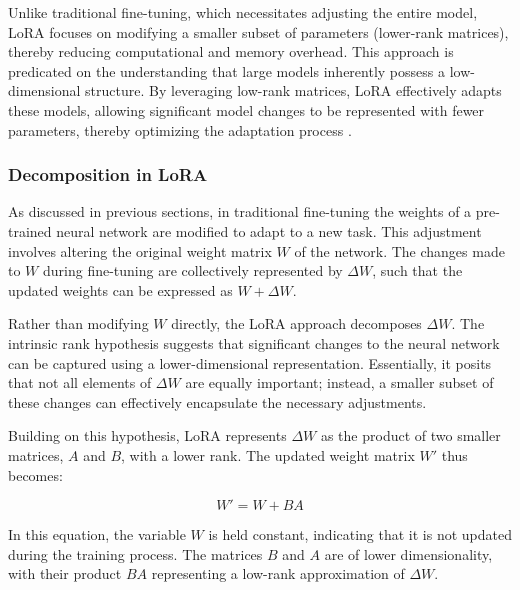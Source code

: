 Unlike traditional fine-tuning, which necessitates adjusting the entire model, LoRA focuses on modifying a smaller subset of parameters (lower-rank matrices), thereby reducing computational and memory overhead. This approach is predicated on the understanding that large models inherently possess a low-dimensional structure. By leveraging low-rank matrices, LoRA effectively adapts these models, allowing significant model changes to be represented with fewer parameters, thereby optimizing the adaptation process \cite{hu2021lora}.

\subsubsection{Decomposition in LoRA}

As discussed in previous sections, in traditional fine-tuning the weights of a pre-trained neural network are modified to adapt to a new task. This adjustment involves altering the original weight matrix \( W \) of the network. The changes made to \( W \) during fine-tuning are collectively represented by \( \Delta W \), such that the updated weights can be expressed as \( W + \Delta W \).

Rather than modifying \( W \) directly, the LoRA approach decomposes \( \Delta W \). The intrinsic rank hypothesis suggests that significant changes to the neural network can be captured using a lower-dimensional representation. Essentially, it posits that not all elements of \( \Delta W \) are equally important; instead, a smaller subset of these changes can effectively encapsulate the necessary adjustments.

Building on this hypothesis, LoRA represents \( \Delta W \) as the product of two smaller matrices, \( A \) and \( B \), with a lower rank. The updated weight matrix \( W' \) thus becomes:

\begin{equation}
    W' = W + BA
\end{equation}

In this equation, the variable \( W \) is held constant, indicating that it is not updated during the training process. The matrices \( B \) and \( A \) are of lower dimensionality, with their product \( BA \) representing a low-rank approximation of \( \Delta W \).

